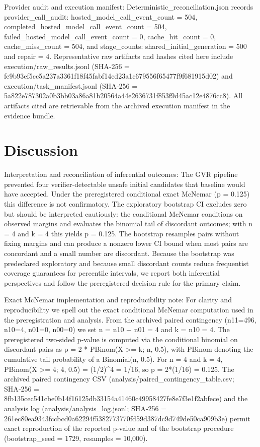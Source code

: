 \documentclass[conference]{IEEEtran}
\begin{document}
Provider audit and execution manifest: Deterministic\_reconciliation.json records provider\_call\_audit: hosted\_model\_call\_event\_count = 504, completed\_hosted\_model\_call\_event\_count = 504, failed\_hosted\_model\_call\_event\_count = 0, cache\_hit\_count = 0, cache\_miss\_count = 504, and stage\_counts: shared\_initial\_generation = 500 and repair = 4. Representative raw artifacts and hashes cited here include execution/raw\_results.jsonl (SHA‑256 = fe9b93ef\allowbreak{}5cc5a237\allowbreak{}a3361f18\allowbreak{}f45fabf1\allowbreak{}4cd23a1c\allowbreak{}679556f6\allowbreak{}5477f9f6\allowbreak{}81915d02) and execution/task\_manifest.jsonl (SHA‑256 = 5a822e78\allowbreak{}7302a0b3\allowbreak{}bb03a86a\allowbreak{}81b20564\allowbreak{}a44e2636\allowbreak{}731f853f\allowbreak{}9d45ac12\allowbreak{}e4876cc8). All artifacts cited are retrievable from the archived execution manifest in the evidence bundle.

\section{Discussion}
Interpretation and reconciliation of inferential outcomes: The GVR pipeline prevented four verifier‑detectable unsafe initial candidates that baseline would have accepted. Under the preregistered conditional exact McNemar (p = 0.125) this difference is not confirmatory. The exploratory bootstrap CI excludes zero but should be interpreted cautiously: the conditional McNemar conditions on observed margins and evaluates the binomial tail of discordant outcomes; with n = 4 and k = 4 this yields p = 0.125. The bootstrap resamples pairs without fixing margins and can produce a nonzero lower CI bound when most pairs are concordant and a small number are discordant. Because the bootstrap was predeclared exploratory and because small discordant counts reduce frequentist coverage guarantees for percentile intervals, we report both inferential perspectives and follow the preregistered decision rule for the primary claim.

Exact McNemar implementation and reproducibility note: For clarity and reproducibility we spell out the exact conditional McNemar computation used in the preregistration and analysis. From the archived paired contingency (n11=496, n10=4, n01=0, n00=0) we set n = n10 + n01 = 4 and k = n10 = 4. The preregistered two‑sided p‑value is computed via the conditional binomial on discordant pairs as p = 2 * PBinom(X >= k; n, 0.5), with PBinom denoting the cumulative tail probability of a Binomial(n, 0.5). For n = 4 and k = 4, PBinom(X >= 4; 4, 0.5) = (1/2)\textasciicircum{}4 = 1/16, so p = 2*(1/16) = 0.125. The archived paired contingency CSV (analysis/paired\_contingency\_table.csv; SHA‑256 = 8fb135ce\allowbreak{}c541cbe0\allowbreak{}b14f1612\allowbreak{}5db33154\allowbreak{}a41460c4\allowbreak{}9958427f\allowbreak{}e8e7f3e1\allowbreak{}f2abfece) and the analysis log (analysis/analysis\_log.jsonl; SHA‑256 = 261ec80e\allowbreak{}a9343fcc\allowbreak{}bcd0a622\allowbreak{}94f53827\allowbreak{}73770fd5\allowbreak{}9d387dc9\allowbreak{}d749de50\allowbreak{}ca909b3e) permit exact reproduction of the reported p‑value and of the bootstrap procedure (bootstrap\_seed = 1729, resamples = 10,000).
\end{document}
